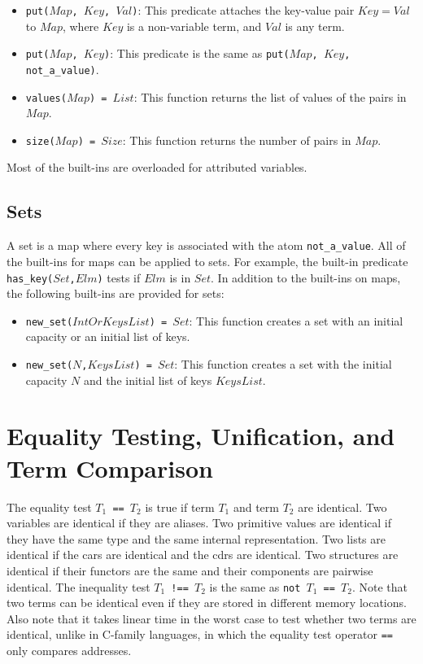 \begin{itemize}
\item \texttt{put($Map$, $Key$, $Val$)}: This predicate attaches the key-value pair \texttt{$Key$$=$$Val$} to \texttt{$Map$}, where \texttt{$Key$} is a non-variable term, and \texttt{$Val$} is any term. 
\item \texttt{put($Map$, $Key$)}: This predicate is the same as \texttt{put($Map$, $Key$, not\_a\_value)}.
\item \texttt{values($Map$) = $List$}: This function returns the list of values of the pairs in $Map$.
\item \texttt{size($Map$) = $Size$}: This function returns the number of pairs in $Map$.
\end{itemize}
Most of the built-ins are overloaded for attributed variables.

\subsection{Sets}
A set is a map where every key is associated with the atom \texttt{not\_a\_value}. All of the built-ins for maps can be applied to sets. For example, the built-in predicate \texttt{has\_key($Set$,$Elm$)} tests if $Elm$ is in $Set$. In addition to the built-ins on maps, the following built-ins are provided for sets:
\begin{itemize}
\item \texttt{new\_set($IntOrKeysList$) = $Set$}: This function creates a set with an initial capacity or an initial list of keys.
\item \texttt{new\_set($N$,$KeysList$) = $Set$}: This function creates a set with the initial capacity $N$ and the initial list of keys $KeysList$.
\end{itemize}

\section{\label{sec:unification}Equality Testing, Unification, and Term Comparison}
The equality test \texttt{$T_1$ == $T_2$}  is true if term $T_1$ and term $T_2$ are identical. Two variables are identical if they are aliases. Two primitive values are identical if they have the same type and the same internal representation. Two lists are identical if the cars are identical and the cdrs are identical. Two structures are identical if their functors are the same and their components are pairwise identical. The inequality test \texttt{$T_1$ !== $T_2$} is the same as \texttt{not $T_1$ == $T_2$}.  Note that two terms can be identical even if they are stored in different memory locations.  Also note that it takes linear time in the worst case to test whether two terms are identical, unlike in C-family languages, in which the equality test operator \texttt{==} only compares addresses.

